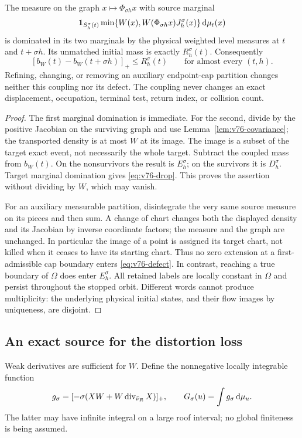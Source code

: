 \begin{theorem}
\label{thm:v76-subcoupling}
The measure on the graph $x\mapsto\Phi_{\sigma h}x$ with source
marginal
\[
 \mathbf1_{S^\sigma_h(t)}
 \min\{W(x),W(\Phi_{\sigma h}x)J^\sigma_h(x)\}\,\mathrm d\mu_t(x)
\]
is dominated in its two marginals by the physical weighted level
measures at $t$ and $t+\sigma h$. Its unmatched initial mass is
exactly $R^\sigma_h(t)$. Consequently
\begin{equation}\label{eq:v76-drop}
 [b_W(t)-b_W(t+\sigma h)]_+\le R^\sigma_h(t)
 \qquad\text{for almost every }(t,h).
\end{equation}
Refining, changing, or removing an auxiliary endpoint-cap partition
changes neither this coupling nor its defect. The coupling never
changes an exact displacement, occupation, terminal test, return
index, or collision count.
\end{theorem}
\begin{proof}
The first marginal domination is immediate. For the second, divide
by the positive Jacobian on the surviving graph and use
Lemma~\ref{lem:v76-covariance}; the transported density is at most
$W$ at its image. The image is a subset of the target exact event,
not necessarily the whole target. Subtract the coupled mass from
$b_W(t)$. On the nonsurvivors the result is $E^\sigma_h$; on the
survivors it is $D^\sigma_h$. Target marginal domination gives
\eqref{eq:v76-drop}. This proves the assertion without dividing by
$W$, which may vanish.

For an auxiliary measurable partition, disintegrate the very same
source measure on its pieces and then sum. A change of chart changes
both the displayed density and its Jacobian by inverse coordinate
factors; the measure and the graph are unchanged. In particular the
image of a point is assigned its target chart, not killed when it
ceases to have its starting chart. Thus no zero extension at a
first-admissible cap boundary enters \eqref{eq:v76-defect}. In contrast,
reaching a true boundary of $\Omega$ does enter $E^\sigma_h$.
All retained labels are locally constant in $\Omega$ and persist
throughout the stopped orbit. Different words cannot produce
multiplicity: the underlying physical initial states, and their
flow images by uniqueness, are disjoint.
\end{proof}

\subsection{An exact source for the distortion loss}
Weak derivatives are sufficient for $W$. Define the nonnegative
locally integrable function
\begin{equation}\label{eq:v76-drift-source}
 g_\sigma=[-\sigma(XW+W\diver_{\bar\nu_R}X)]_+,
 \qquad G_\sigma(u)=\int g_\sigma\dd\mu_u.
\end{equation}
The latter may have infinite integral on a large roof interval;
no global finiteness is being assumed.

